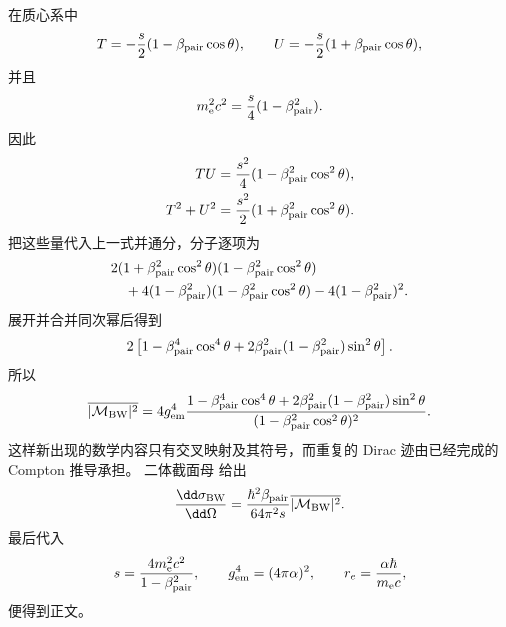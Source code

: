 \begin{derivation}[双光子产生电子对的角分布]
在质心系中
\begin{equation*}
 T=-\frac s2(1-\beta_{\rm pair}\cos\theta),
 \qquad
 U=-\frac s2(1+\beta_{\rm pair}\cos\theta),
\end{equation*}
并且
\begin{equation*}
 m_{\mathrm e}^2c^2=\frac s4(1-\beta_{\rm pair}^2).
\end{equation*}
因此
\begin{align*}
 TU
 &=\frac{s^2}{4}(1-\beta_{\rm pair}^2\cos^2\theta),\\
 T^2+U^2
 &=\frac{s^2}{2}(1+\beta_{\rm pair}^2\cos^2\theta).
\end{align*}
把这些量代入上一式并通分，分子逐项为
\begin{align*}
 &2(1+\beta_{\rm pair}^2\cos^2\theta)
 (1-\beta_{\rm pair}^2\cos^2\theta)\\
 &\quad+4(1-\beta_{\rm pair}^2)
 (1-\beta_{\rm pair}^2\cos^2\theta)
 -4(1-\beta_{\rm pair}^2)^2.
\end{align*}
展开并合并同次幂后得到
\begin{equation*}
 2\left[
 1-\beta_{\rm pair}^4\cos^4\theta
 +2\beta_{\rm pair}^2(1-\beta_{\rm pair}^2)\sin^2\theta
 \right].
\end{equation*}
所以
\begin{equation*}
 {
 \overline{|\mathcal M_{\rm BW}|^2}
 =4g_{\rm em}^4
 \frac{
 1-\beta_{\rm pair}^4\cos^4\theta
 +2\beta_{\rm pair}^2(1-\beta_{\rm pair}^2)\sin^2\theta
 }{(1-\beta_{\rm pair}^2\cos^2\theta)^2}.}
\end{equation*}
这样新出现的数学内容只有交叉映射及其符号，而重复的 Dirac 迹由已经完成的 Compton 推导承担。
二体截面母 给出
\begin{equation*}
 \frac{\dd\sigma_{\rm BW}}{\dd\Omega}
 =\frac{\hbar^2\beta_{\rm pair}}{64\pi^2s}
 \overline{|\mathcal M_{\rm BW}|^2}.
\end{equation*}
最后代入
\begin{equation*}
 s=\frac{4m_{\mathrm e}^2c^2}{1-\beta_{\rm pair}^2},\qquad
 g_{\rm em}^4=(4\pi\alpha)^2,\qquad
 r_e=\frac{\alpha\hbar}{m_{\mathrm e} c},
\end{equation*}
便得到正文。
\end{derivation}

